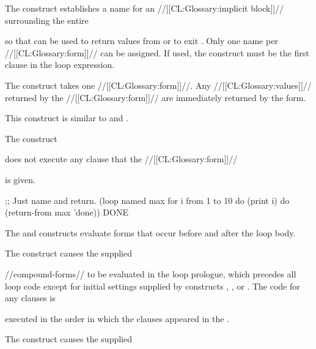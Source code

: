 The  construct
establishes a name for an //[[CL:Glossary:implicit block]]// surrounding the 
entire

 so that  can be used to return 
values from or to exit .   
Only one name per  //[[CL:Glossary:form]]// can be assigned.
If used, the  construct must be the first clause in the loop expression.


 The  construct takes one //[[CL:Glossary:form]]//. 
 Any //[[CL:Glossary:values]]// returned by the //[[CL:Glossary:form]]// 
 are immediately returned by the  form.

This construct is similar to  and .


The  construct 


does not execute any  clause that 
the  //[[CL:Glossary:form]]//

is given.
                

\code
;; Just name and return.
 (loop named max
       for i from 1 to 10
       do (print i)
       do (return-from max 'done))
\EV DONE
\endcode

\endsubsubsubsection%

\endsubsubsection%

 
The  and  constructs
evaluate forms that occur before and after the loop body.

The  construct causes the supplied


//compound-forms//
to be evaluated
in the loop prologue, which precedes all loop code except for 
initial settings supplied by constructs , , or
.
  The code for any  clauses is 



executed
in the order in which the clauses appeared in
  the .  




  
The  construct causes the supplied


